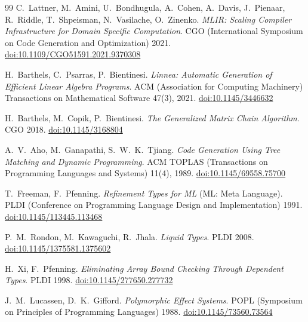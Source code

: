 \begingroup
\renewcommand{\chapter}[2]{}%
\renewcommand{\bibname}{References}
\begin{thebibliography}{99}
 C.~Lattner, M.~Amini, U.~Bondhugula, A.~Cohen, A.~Davis,
  J.~Pienaar, R.~Riddle, T.~Shpeisman, N.~Vasilache, O.~Zinenko.
  \emph{MLIR: Scaling Compiler Infrastructure for Domain Specific
  Computation}. CGO (International Symposium on Code Generation and
  Optimization) 2021.
  \href{https://doi.org/10.1109/CGO51591.2021.9370308}{doi:10.1109/CGO51591.2021.9370308}

 H.~Barthels, C.~Psarras, P.~Bientinesi. \emph{Linnea:
  Automatic Generation of Efficient Linear Algebra Programs}. ACM (Association for Computing Machinery)
  Transactions on Mathematical Software 47(3), 2021.
  \href{https://doi.org/10.1145/3446632}{doi:10.1145/3446632}

 H.~Barthels, M.~Copik, P.~Bientinesi. \emph{The Generalized
  Matrix Chain Algorithm}. CGO 2018.
  \href{https://doi.org/10.1145/3168804}{doi:10.1145/3168804}

 A.~V.~Aho, M.~Ganapathi, S.~W.~K.~Tjiang.
  \emph{Code Generation Using Tree Matching and Dynamic Programming}. ACM
  TOPLAS (Transactions on Programming Languages and Systems) 11(4), 1989.
  \href{https://doi.org/10.1145/69558.75700}{doi:10.1145/69558.75700}

 T.~Freeman, F.~Pfenning. \emph{Refinement Types for
  ML} (ML: Meta Language). PLDI (Conference on Programming Language Design
  and Implementation) 1991.
  \href{https://doi.org/10.1145/113445.113468}{doi:10.1145/113445.113468}

 P.~M.~Rondon, M.~Kawaguchi, R.~Jhala. \emph{Liquid
  Types}. PLDI 2008.
  \href{https://doi.org/10.1145/1375581.1375602}{doi:10.1145/1375581.1375602}

 H.~Xi, F.~Pfenning. \emph{Eliminating Array Bound Checking
  Through Dependent Types}. PLDI 1998.
  \href{https://doi.org/10.1145/277650.277732}{doi:10.1145/277650.277732}

 J.~M.~Lucassen, D.~K.~Gifford. \emph{Polymorphic Effect
  Systems}. POPL (Symposium on Principles of Programming Languages) 1988.
  \href{https://doi.org/10.1145/73560.73564}{doi:10.1145/73560.73564}


\end{thebibliography}
